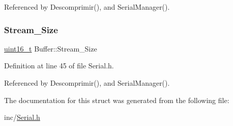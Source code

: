 Referenced by Descomprimir(), and Serial\+Manager().

\mbox{\label{structBuffer_ad2ce1666d61d13e70634895da5a90696}} 
\subsubsection{\texorpdfstring{Stream\+\_\+\+Size}{Stream\_Size}}
{\footnotesize\ttfamily \hyperlink{RegsLPC1769_8h_a273cf69d639a59973b6019625df33e30}{uint16\+\_\+t} Buffer\+::\+Stream\+\_\+\+Size}



Definition at line 45 of file Serial.\+h.



Referenced by Descomprimir(), and Serial\+Manager().



The documentation for this struct was generated from the following file\+:\begin{DoxyCompactItemize}
\item 
inc/\hyperlink{Serial_8h}{Serial.\+h}\end{DoxyCompactItemize}
